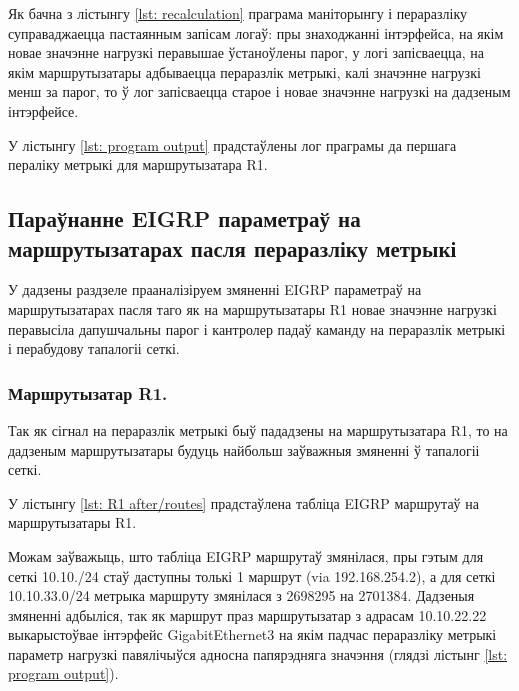 

Як бачна з лістынгу \ref{lst: recalculation} праграма маніторынгу і пераразліку суправаджаецца пастаянным
запісам логаў: пры знаходжанні інтэрфейса, на якім новае значэнне нагрузкі перавышае ўстаноўлены парог,
у логі запісваецца, на якім маршрутызатары адбываецца пераразлік метрыкі, калі значэнне нагрузкі менш за парог,
то ў лог запісваецца старое і новае значэнне нагрузкі на дадзеным інтэрфейсе.

У лістынгу \ref{lst: program output} прадстаўлены лог праграмы да першага пераліку метрыкі для маршрутызатара R1.



\subsection{Параўнанне EIGRP параметраў на маршрутызатарах пасля пераразліку метрыкі}

У дадзены раздзеле прааналізіруем змяненні EIGRP параметраў на маршрутызатарах пасля таго як
на маршрутызатары R1 новае значэнне нагрузкі перавысіла дапушчальны парог і кантролер падаў
каманду на пераразлік метрыкі і перабудову тапалогіі сеткі.

\subsubsection{Маршрутызатар R1.}

Так як сігнал на пераразлік метрыкі быў пададзены на маршрутызатара R1, то на дадзеным
маршрутызатары будуць найбольш заўважныя змяненні ў тапалогіі сеткі.

У лістынгу \ref{lst: R1 after/routes} прадстаўлена табліца EIGRP маршрутаў на маршрутызатары R1.



Можам заўважыць, што табліца EIGRP маршрутаў змянілася, пры гэтым
для сеткі 10.10./24 стаў даступны толькі 1 маршрут (via 192.168.254.2), а для сеткі 10.10.33.0/24 метрыка маршруту змянілася з 2698295 на 2701384.
Дадзеныя змяненні адбыліся, так як маршрут праз маршрутызатар з адрасам
10.10.22.22 выкарыстоўвае інтэрфейс GigabitEthernet3 на якім падчас пераразліку
метрыкі параметр нагрузкі павялічыўся адносна папярэдняга значэння (глядзі лістынг \ref{lst: program output}).


